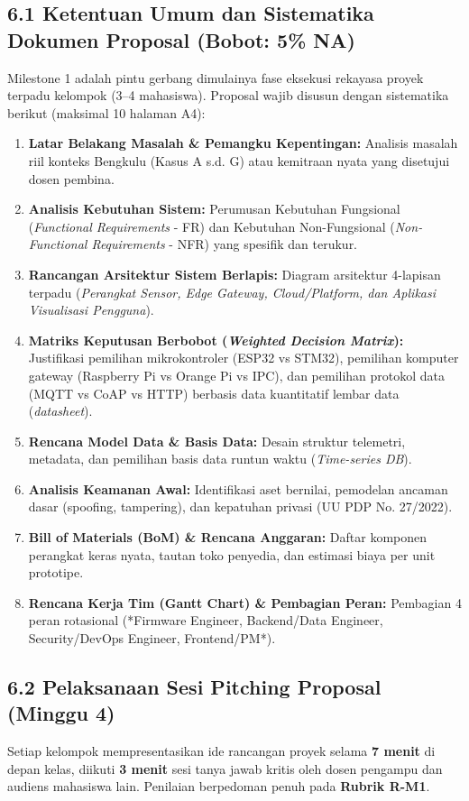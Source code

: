 \documentclass[11pt,a4paper]{article}
\begin{document}
\subsection*{6.1 Ketentuan Umum dan Sistematika Dokumen Proposal (Bobot: 5\% NA)}
Milestone 1 adalah pintu gerbang dimulainya fase eksekusi rekayasa proyek terpadu kelompok (3--4 mahasiswa). Proposal wajib disusun dengan sistematika berikut (maksimal 10 halaman A4):
\begin{enumerate}
    \item \textbf{Latar Belakang Masalah \& Pemangku Kepentingan:} Analisis masalah riil konteks Bengkulu (Kasus A s.d. G) atau kemitraan nyata yang disetujui dosen pembina.
    \item \textbf{Analisis Kebutuhan Sistem:} Perumusan Kebutuhan Fungsional (\textit{Functional Requirements} - FR) dan Kebutuhan Non-Fungsional (\textit{Non-Functional Requirements} - NFR) yang spesifik dan terukur.
    \item \textbf{Rancangan Arsitektur Sistem Berlapis:} Diagram arsitektur 4-lapisan terpadu (\textit{Perangkat Sensor, Edge Gateway, Cloud/Platform, dan Aplikasi Visualisasi Pengguna}).
    \item \textbf{Matriks Keputusan Berbobot (\textit{Weighted Decision Matrix}):} Justifikasi pemilihan mikrokontroler (ESP32 vs STM32), pemilihan komputer gateway (Raspberry Pi vs Orange Pi vs IPC), dan pemilihan protokol data (MQTT vs CoAP vs HTTP) berbasis data kuantitatif lembar data (\textit{datasheet}).
    \item \textbf{Rencana Model Data \& Basis Data:} Desain struktur telemetri, metadata, dan pemilihan basis data runtun waktu (\textit{Time-series DB}).
    \item \textbf{Analisis Keamanan Awal:} Identifikasi aset bernilai, pemodelan ancaman dasar (spoofing, tampering), dan kepatuhan privasi (UU PDP No. 27/2022).
    \item \textbf{Bill of Materials (BoM) \& Rencana Anggaran:} Daftar komponen perangkat keras nyata, tautan toko penyedia, dan estimasi biaya per unit prototipe.
    \item \textbf{Rencana Kerja Tim (Gantt Chart) \& Pembagian Peran:} Pembagian 4 peran rotasional (*Firmware Engineer, Backend/Data Engineer, Security/DevOps Engineer, Frontend/PM*).
\end{enumerate}

\subsection*{6.2 Pelaksanaan Sesi Pitching Proposal (Minggu 4)}
Setiap kelompok mempresentasikan ide rancangan proyek selama \textbf{7 menit} di depan kelas, diikuti \textbf{3 menit} sesi tanya jawab kritis oleh dosen pengampu dan audiens mahasiswa lain. Penilaian berpedoman penuh pada \textbf{Rubrik R-M1}.
\end{document}
